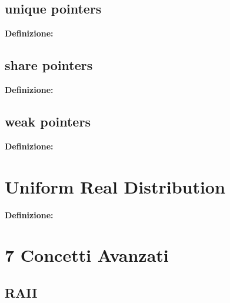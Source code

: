 \subsection{unique pointers}

\textsf{\small \textbf{Definizione: } } \\

\subsection{share pointers}

\textsf{\small \textbf{Definizione: } } \\

\subsection{weak pointers}

\textsf{\small \textbf{Definizione: } } \\


\newpage

\section{Uniform Real Distribution}

\textsf{\small \textbf{Definizione: } } \\



\newpage




\section{7 Concetti Avanzati}

\subsection{RAII}

